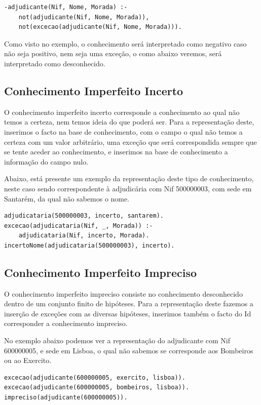 \documentclass[a4paper]{report}
\begin{document}
\begin{verbatim}
-adjudicante(Nif, Nome, Morada) :-
    not(adjudicante(Nif, Nome, Morada)),
    not(excecao(adjudicante(Nif, Nome, Morada))).
\end{verbatim}

Como visto no exemplo, o conhecimento será interpretado como negativo caso não
seja positivo, nem seja uma exceção, o como abaixo veremos, será interpretado
como desconhecido.

\subsection{Conhecimento Imperfeito Incerto}
O conhecimento imperfeito incerto corresponde a conhecimento ao qual não temos a
certeza, nem temos ideia do que poderá ser. Para a representação deste,
inserimos o facto na base de conhecimento, com o campo o qual não temos a
certeza com um valor arbitrário, uma exceção que será correspondida sempre que
se tente aceder ao conhecimento, e inserimos na base de conhecimento a
informação do campo nulo.

Abaixo, está presente um exemplo da representação deste tipo de conhecimento,
neste caso sendo correspondente à adjudicária com Nif 500000003, com sede em
Santarém, da qual não sabemos o nome.
\begin{verbatim}
adjudicataria(500000003, incerto, santarem).
excecao(adjudicataria(Nif, _, Morada)) :-
    adjudicataria(Nif, incerto, Morada).
incertoNome(adjudicataria(500000003), incerto).
\end{verbatim}

\subsection{Conhecimento Imperfeito Impreciso}
O conhecimento imperfeito impreciso consiste no conhecimento desconhecido dentro
de um conjunto finito de hipóteses. Para a representação deste fazemos a
inserção de exceções com as diversas hipóteses, inserimos também o facto do Id
corresponder a conhecimento impreciso.

No exemplo abaixo podemos ver a representação do adjudicante com Nif 600000005,
e sede em Lisboa, o qual não sabemos se corresponde aos Bombeiros ou ao
Exercito.

\begin{verbatim}
excecao(adjudicante(600000005, exercito, lisboa)).
excecao(adjudicante(600000005, bombeiros, lisboa)).
impreciso(adjudicante(600000005)).
\end{verbatim}
\end{document}
